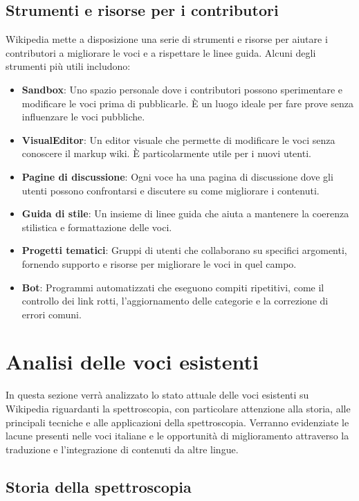 \documentclass[12pt,a4paper]{report}
\begin{document}
\subsection{Strumenti e risorse per i contributori}

Wikipedia mette a disposizione una serie di strumenti e risorse per aiutare i contributori a migliorare le voci e a rispettare le linee guida. Alcuni degli strumenti più utili includono:

\begin{itemize}
    \item \textbf{Sandbox}: Uno spazio personale dove i contributori possono sperimentare e modificare le voci prima di pubblicarle. È un luogo ideale per fare prove senza influenzare le voci pubbliche.
    \item \textbf{VisualEditor}: Un editor visuale che permette di modificare le voci senza conoscere il markup wiki. È particolarmente utile per i nuovi utenti.
    \item \textbf{Pagine di discussione}: Ogni voce ha una pagina di discussione dove gli utenti possono confrontarsi e discutere su come migliorare i contenuti.
    \item \textbf{Guida di stile}: Un insieme di linee guida che aiuta a mantenere la coerenza stilistica e formattazione delle voci.
    \item \textbf{Progetti tematici}: Gruppi di utenti che collaborano su specifici argomenti, fornendo supporto e risorse per migliorare le voci in quel campo.
    \item \textbf{Bot}: Programmi automatizzati che eseguono compiti ripetitivi, come il controllo dei link rotti, l'aggiornamento delle categorie e la correzione di errori comuni.
\end{itemize}

\section{Analisi delle voci esistenti}

In questa sezione verrà analizzato lo stato attuale delle voci esistenti su Wikipedia riguardanti la spettroscopia, con particolare attenzione alla storia, alle principali tecniche e alle applicazioni della spettroscopia. Verranno evidenziate le lacune presenti nelle voci italiane e le opportunità di miglioramento attraverso la traduzione e l'integrazione di contenuti da altre lingue.

\subsection{Storia della spettroscopia}
\end{document}
